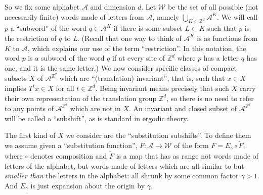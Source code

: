 \documentclass[reqno]{stml-l}
\theoremstyle{plain}
\theoremstyle{definition}
\numberwithin{equation}{chapter}
\begin{document}
So we fix some alphabet $\mathcal{A}$ and dimension $d$.
Let $\mathcal{W}$ be the set
of all possible (not necessarily finite) words made of
letters from $\mathcal{A}$, namely $\bigcup_{K\subset
\mathbb{Z}^{d}}\mathcal{A}^{K}$. We will call $p$ a
``subword'' of the word $q\in
\mathcal{A}^{K}$ if there is some subset $L\subset K$ such
that $p$ is the restriction of $q$ to \emph{L}. (Recall
that one way to think of $\mathcal{A}^{K}$ is as functions
from $K$ to $\mathcal{A}$, which explains our use of the
term ``restriction''. In this notation, the word $p$ is a
subword of the word $q$ if at every site of
$\mathbb{Z}^{d}$ where $p$ has a letter $q$ has one, and it
is the same letter.) We now consider specific classes of
compact subsets $X$ of $\mathcal{A}^{\mathbb{Z}^{d}}$ which
are ``(translation) invariant'', that is, such that $x\in X$ implies $T^{t}x\in
X$ for all $t\in \mathbb{Z}^{d}$. Being invariant means
precisely that such $X$ carry their own representation of
the translation group $\mathbb{Z}^{d}$, so there is no need
to refer to any points of $\mathcal{A}^{\mathbb{Z}^{d}}$
which are not in $X$. An invariant and closed subset of
$\mathcal{A}^{\mathbb{Z}^{d}}$ will be called a
``subshift'', as is standard in
ergodic theory.

The first kind of $X$ we consider are the ``substitution
subshifts''. To define
them we assume given a ``substitution
function'',
$F:\mathcal{A}\longrightarrow \mathcal{W}$ of the form
$F=E_{\gamma}\circ\tilde{F}$, where $\circ$ denotes
composition and $\tilde{F}$ is a map that has as range not
words made of letters of the alphabet, but words made of
letters which are all similar to but \emph{smaller than}
the letters in the alphabet: all shrunk by some common
factor $\gamma>1$. And $E_{\gamma}$ is just expansion about
the origin by $\gamma$.
\end{document}
